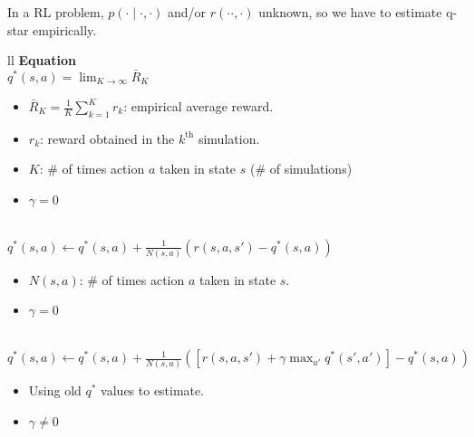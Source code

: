 \begin{summary} In a RL problem, $p(\cdot \mid \cdot, \cdot)$ and/or $r(\cdot \cdot, \cdot)$ unknown, so we have to estimate q-star empirically. 
    \begin{center}
        \begin{tabular}{ll}
            \toprule
            \textbf{Equation} \\
            \midrule
            $q^*(s,a) = \lim_{K \to \infty} \bar{R}_K$ \\
            {
            \begin{itemize}
                \item $\bar{R}_K = \frac{1}{K} \sum_{k=1}^{K} r_k$: empirical average reward. 
                \item $r_k$: reward obtained in the $k^\text{th}$ simulation.
                \item $K$: \# of times action $a$ taken in state $s$ (\# of simulations)
                \item $\gamma = 0$
            \end{itemize}
            } \\
            \midrule
            $q^*(s,a) \gets q^*(s,a) + \frac{1}{N(s,a)} \left( r(s,a,s') - q^*(s,a) \right)$ \\
            {
            \begin{itemize}
                \item $N(s,a)$: \# of times action $a$ taken in state $s$.
                \item $\gamma = 0$
            \end{itemize}
            } \\
            \midrule 
            $q^*(s,a) \gets q^*(s,a) + \frac{1}{N(s,a)} \left( \left[ r(s,a,s') + \gamma \max_{a'} q^*(s', a') \right] - q^*(s,a) \right)$ \\
            {
            \begin{itemize}
                \item Using old $q^*$ values to estimate. 
                \item $\gamma \neq 0$
            \end{itemize}
            } \\
            \bottomrule
        \end{tabular}
    \end{center}
\end{summary}

